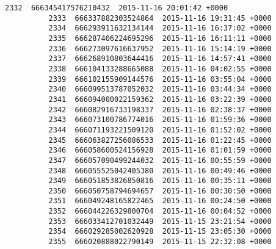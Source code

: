 \documentclass[11pt]{article}
\begin{document}
\begin{Verbatim}[commandchars=\\\{\}]
          2332  666345417576210432  2015-11-16 20:01:42 +0000   
          2333  666337882303524864  2015-11-16 19:31:45 +0000   
          2334  666293911632134144  2015-11-16 16:37:02 +0000   
          2335  666287406224695296  2015-11-16 16:11:11 +0000   
          2336  666273097616637952  2015-11-16 15:14:19 +0000   
          2337  666268910803644416  2015-11-16 14:57:41 +0000   
          2338  666104133288665088  2015-11-16 04:02:55 +0000   
          2339  666102155909144576  2015-11-16 03:55:04 +0000   
          2340  666099513787052032  2015-11-16 03:44:34 +0000   
          2341  666094000022159362  2015-11-16 03:22:39 +0000   
          2342  666082916733198337  2015-11-16 02:38:37 +0000   
          2343  666073100786774016  2015-11-16 01:59:36 +0000   
          2344  666071193221509120  2015-11-16 01:52:02 +0000   
          2345  666063827256086533  2015-11-16 01:22:45 +0000   
          2346  666058600524156928  2015-11-16 01:01:59 +0000   
          2347  666057090499244032  2015-11-16 00:55:59 +0000   
          2348  666055525042405380  2015-11-16 00:49:46 +0000   
          2349  666051853826850816  2015-11-16 00:35:11 +0000   
          2350  666050758794694657  2015-11-16 00:30:50 +0000   
          2351  666049248165822465  2015-11-16 00:24:50 +0000   
          2352  666044226329800704  2015-11-16 00:04:52 +0000   
          2353  666033412701032449  2015-11-15 23:21:54 +0000   
          2354  666029285002620928  2015-11-15 23:05:30 +0000   
          2355  666020888022790149  2015-11-15 22:32:08 +0000   
          

\end{Verbatim}
\end{document}
